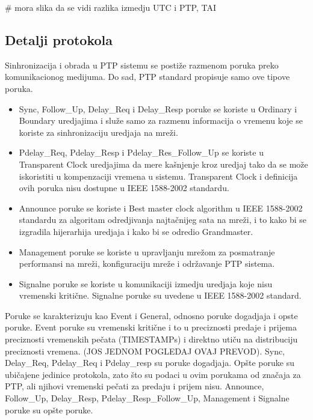 \documentclass[a4paper,12pt, master]{etf}
\begin{document}
	\# mora slika da se vidi razlika izmedju UTC i PTP, TAI

        \subsection{Detalji protokola}

	Sinhronizacija i obrada u PTP sistemu se posti\v{z}e razmenom poruka preko komunikacionog
	medijuma. Do sad, PTP standard propisuje samo ove tipove poruka.

        \begin{itemize}
	    \item Sync, Follow\_Up, Delay\_Req i Delay\_Resp poruke se koriste u Ordinary i Boundary
	    uredjajima i slu\v{z}e samo za razmenu informacija o vremenu koje se koriste za
	    sinhronizaciju uredjaja na mre\v{z}i.
	    \item Pdelay\_Req, Pdelay\_Resp i Pdelay\_Res\_Follow\_Up se koriste u Transparent Clock
	    uredjajima da mere ka\v{s}njenje kroz uredjaj tako da se mo\v{z}e iskoristiti u kompenzaciji
	    vremena u sistemu. Transparent Clock i definicija ovih poruka nisu dostupne u IEEE
	    1588-2002 standardu.
	    \item Announce poruke se koriste i Best master clock algorithm u IEEE 1588-2002 standardu za
	    algoritam odredjivanja najta\v{c}nijeg sata na mre\v{z}i, i to kako bi se izgradila hijerarhija
	    uredjaja i kako bi se odredio Grandmaster.
            \item Management poruke se koriste u upravljanju mre\v{z}om za posmatranje performansi na
            mre\v{z}i, konfiguraciju mre\v{z}e i odr\v{z}avanje PTP sistema.
	    \item Signalne poruke se koriste u komunikaciji izmedju uredjaja koje nisu vremenski kriti\v{c}ne.
            Signalne poruke su uvedene u IEEE 1588-2002 standard.
        \end{itemize}

	Poruke se karakterizuju kao Event i General, odnosno poruke dogadjaja i opste poruke. Event
	poruke su vremenski kriti\v{c}ne i to u preciznosti predaje i prijema preciznosti vremenskih
	pe\v{c}ata (TIMESTAMPs) i direktno uti\v{c}u na distribuciju preciznosti vremena. (JOS JEDNOM
	POGLEDAJ OVAJ PREVOD). Sync, Delay\_Req, Pdelay\_Req i Pdelay\_resp su poruke dogadjaja.
	Op\v{s}te poruke su ubi\v{c}ajene jedinice protokola, zato \v{s}to su podaci u ovim porukama od
	zna\v{c}aja za PTP, ali njihovi vremenski pe\v{c}ati za predaju i prijem nisu. Announce, Follow\_Up,
	Delay\_Resp, Pdelay\_Resp\_Follow\_Up, Management i Signalne poruke su op\v{s}te poruke.
\end{document}
